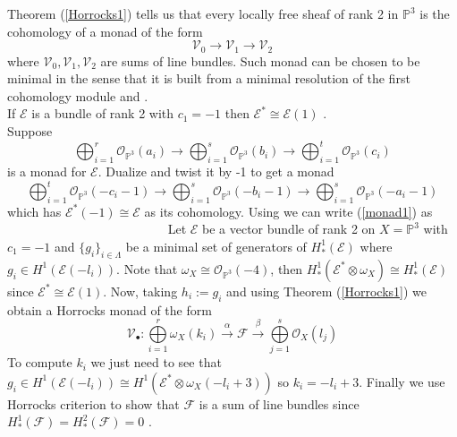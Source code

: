 \documentclass[
	oldfontcommands,
	sumario=abnt-6027-2012,
	12pt,			%
	openright,		%
	oneside,		%
	a4paper,		%
	english,		%
	brazil			%
	]{imecc-unicamp}
\begin{document}
Theorem (\ref{Horrocks1}) tells us that every locally free sheaf of rank 2 in $\mathbb{P}^3$ is the cohomology of a monad of the form
\begin{equation}
\mathcal{V}_0 \to \mathcal{V}_1 \to \mathcal{V}_2
\end{equation}
where $\mathcal{V}_0, \mathcal{V}_1, \mathcal{V}_2$ are sums of line bundles. Such monad can be chosen to be minimal in the sense that it is built from a minimal resolution of the first cohomology module \cite[Rao]{RAO198423} and \cite[Decker]{Decker1990}.\\
\iffalse
If $\mathcal{E}$ is a bundle of rank 2 with $c_1=-1$ then $\mathcal{E}^* \cong \mathcal{E}(1)$ \cite[Hartshorne, Proposition 1.10]{Hartshorne1980}. \\

Suppose 
\begin{equation}\label{monad1}
\bigoplus_{i=1}^{r} \mathcal{O}_{\mathbb{P}^3}(a_i) \to \bigoplus_{i=1}^{s} \mathcal{O}_{\mathbb{P}^3}(b_i) \to \bigoplus_{i=1}^{t} \mathcal{O}_{\mathbb{P}^3}(c_i)
\end{equation}
is a monad for $\mathcal{E}$. Dualize and twist it by -1 to get a monad
\begin{equation}
\bigoplus_{i=1}^{t} \mathcal{O}_{\mathbb{P}^3}(-c_i-1) \to \bigoplus_{i=1}^{s} \mathcal{O}_{\mathbb{P}^3}(-b_i-1) \to \bigoplus_{i=1}^{s} \mathcal{O}_{\mathbb{P}^3}(-a_i-1)
\end{equation}
which has $\mathcal{E}^* (-1) \cong \mathcal{E}$ as its cohomology. Using \cite[Okonek, Schneider \& Spindler, Corollary 1 p.279]{Okonek} we can write (\ref{monad1}) as
~~~~~~~~~~~~~~~~~~~~~~~~~
Let $\mathcal{E}$ be a vector bundle of rank 2 on $X=\mathbb{P}^3$ with $c_1=-1$ and $\{g_i \}_{i \in \Lambda}$ be a minimal set of generators of $H^1_*(\mathcal{E})$ where $g_i \in H^1(\mathcal{E}(-l_i))$. Note that $\omega_X\cong\mathcal{O}_{\mathbb{P}^3}(-4)$, then $H^1_*(\mathcal{E}^* \otimes \omega_X) \cong H^1_*(\mathcal{E})$ since $\mathcal{E}^* \cong \mathcal{E}(1)$. Now, taking $h_i:=g_i$ and using Theorem (\ref{Horrocks1}) we obtain a Horrocks monad of the form
\begin{equation}
\mathcal{V}_\bullet : \bigoplus\limits_{i=1}^r \omega_X (k_i) \overset{ \alpha }{ \to} \mathcal{F} \overset{ \beta }{ \to} \bigoplus\limits_{j=1}^s \mathcal{O}_X (l_j)
\end{equation}
To compute $k_i$ we just need to see that $g_i \in H^1(\mathcal{E}(-l_i)) \cong H^1(\mathcal{E}^* \otimes \omega_X (-l_i+3))$ so $k_i=-l_i+3$. Finally we use Horrocks criterion to show that $\mathcal{F}$ is a sum of line bundles since $H^1_*(\mathcal{F})=H^2_*(\mathcal{F})=0$ \cite[Horrocks]{doi:10.1112/plms/s3-14.4.689}.
\end{document}
